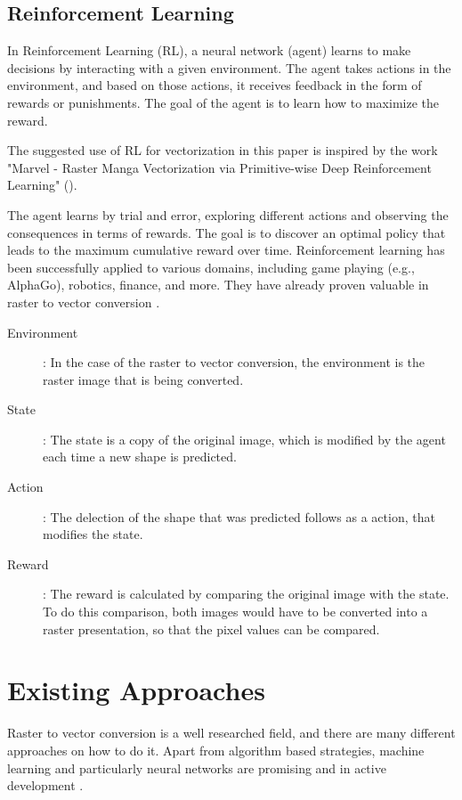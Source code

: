 \documentclass[12pt, a4paper, titlepage]{report}
\begin{document}
\subsection{Reinforcement Learning}

In Reinforcement Learning (RL), a neural network (agent) learns to make decisions by interacting with a given environment. The agent takes actions in the environment, and based on those actions, it receives feedback in the form of rewards or punishments. The goal of the agent is to learn how to maximize the reward.

The suggested use of RL for vectorization in this paper is inspired by the work "Marvel - Raster Manga Vectorization via Primitive-wise Deep Reinforcement Learning"  (\cite{su_marvel_2023}).

The agent learns by trial and error, exploring different actions and observing the consequences in terms of rewards. The goal is to discover an optimal policy that leads to the maximum cumulative reward over time. Reinforcement learning has been successfully applied to various domains, including game playing (e.g., AlphaGo), robotics, finance, and more. They have already proven valuable in raster to vector conversion \cite{su_marvel_2023}.

\begin{description}
   \item[Environment]: In the case of the raster to vector conversion, the environment is the raster image that is being converted.

   \item[State]: The state is a copy of the original image, which is modified by the agent each time a new shape is predicted.

   \item[Action]: The delection of the shape that was predicted follows as a action, that modifies the state.

   \item[Reward]: The reward is calculated by comparing the original image with the state. To do this comparison, both images would have to be converted into a raster presentation, so that the pixel values can be compared.
\end{description}

\section{Existing Approaches}

Raster to vector conversion is a well researched field, and there are many different approaches on how to do it. Apart from algorithm based strategies, machine learning and particularly neural networks are promising and in active development \cite{dziuba_image_2023}.
\end{document}
